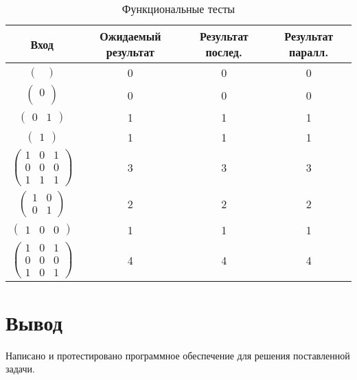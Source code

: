 \begin{table}[ht!]
	\begin{center}
		\captionsetup{justification=raggedright,singlelinecheck=off}
		\caption{\label{tbl:functional_test} Функциональные тесты}
		\begin{tabular}{|c|c|c|c|}
			\hline
			Вход & Ожидаемый результат & Результат послед. & Результат паралл. 
			\\ \hline
			$\begin{pmatrix}
				\\
			\end{pmatrix}$ &
			0&
			0 & 0
			
			\\ \hline
			$\begin{pmatrix}
			0\\
			\end{pmatrix}$ &
			0 &
			0 & 0
			
			\\ \hline
			$\begin{pmatrix}
				0 & 1
			\end{pmatrix}$ &
			1 &
			1 & 1
			
			\\ \hline
			$\begin{pmatrix}
				1
			\end{pmatrix}$ &
			1 &
			1 & 1
			
			\\ \hline
			$\begin{pmatrix}
				1 & 0 & 1\\
				0 & 0 & 0\\
				1 & 1 & 1
			\end{pmatrix}$ &
			3 &
			3 &3
			
			\\ \hline
			$\begin{pmatrix}
				1 & 0 \\
				0 & 1 
			\end{pmatrix}$ &
			2 &
			2 & 2               
			
			\\ \hline
			$\begin{pmatrix}
				1 & 0 & 0
			\end{pmatrix}$ &
			1&
			1 & 1
			
			\\ \hline
			$\begin{pmatrix}
				1 & 0 & 1 \\
				0 & 0 & 0 \\
				1 & 0 & 1
			\end{pmatrix}$ &
			4 &
			4  & 4                
			\\ \hline
		\end{tabular}
	\end{center}
\end{table}

\section*{Вывод}
Написано и протестировано программное обеспечение для решения поставленной задачи.